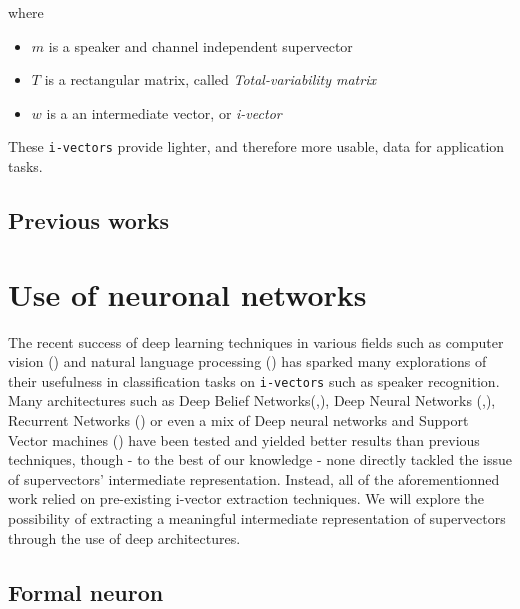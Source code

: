 \documentclass[conference]{IEEEtran}
\begin{document}
where
\begin{itemize}
\item $m$ is a speaker and channel independent supervector
\item $T$ is a rectangular matrix, called \emph{Total-variability matrix}
\item $w$ is a an intermediate vector, or \emph{i-vector}
\end{itemize}

These \texttt{i-vectors} provide lighter, and therefore more usable, data for application tasks.

\subsection{Previous works}

\section{Use of neuronal networks}
\label{sec:Deep}
The recent success of deep learning techniques in various fields such as
computer vision (\cite{lecun1998gradient}) and natural language processing (\cite{bordes2012joint}) has sparked
many explorations of their usefulness in classification tasks on
\texttt{i-vectors} such as speaker recognition. Many architectures such as Deep
Belief Networks(\cite{DBLP:journals/corr/GhahabiH15},\cite{ghahabi2014deep}),
Deep Neural Networks
(\cite{DBLP:journals/corr/GhahabiH15},\cite{ghahabi2014deep}), Recurrent
Networks (\cite{DBLP:journals/corr/SaonSRK16}) or even a mix of
Deep neural networks and Support Vector machines (\cite{richardson2015deep}) have been tested and yielded
better results than previous techniques, though - to the best of our knowledge -
none directly tackled the issue of supervectors' intermediate representation.
Instead, all of the aforementionned work relied on pre-existing i-vector
extraction techniques. We will explore the possibility of extracting a
meaningful intermediate representation of supervectors through the use of deep architectures.

\subsection{Formal neuron}
\end{document}
